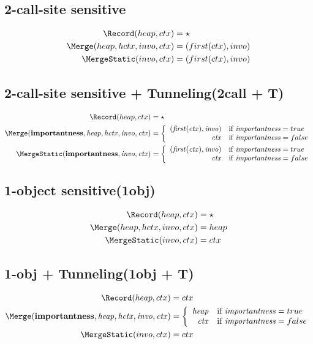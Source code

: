 \subsection{2-call-site sensitive}

\begin{align*}
	\Record (heap, ctx) &=\star\\
	\Merge (heap, hctx, invo, ctx)&= (first(ctx),invo)\\
	\MergeStatic (invo, ctx)&=(first(ctx),invo)\\
\end{align*}

\subsection{2-call-site sensitive + Tunneling(2call + T)}
\begin{align*}
\Record (heap, ctx) &= \star\\
\Merge ({\it \textbf{importantness}, heap, hctx, invo, ctx}) &= \left\{
 \begin{array}{rl}
{\it (first(ctx), invo)} & \mbox{if}~{\it importantness} = true \\
{\it ctx} & \mbox{if}~{\it importantness}=false
\end{array}
\right.\\
\MergeStatic ({\it \textbf{importantness}, invo, ctx}) &= \left\{
\begin{array}{rl}
{\it (first(ctx),invo)} & \mbox{if}~{\it importantness} = true \\
{\it ctx} & \mbox{if}~{\it importantness}=false
\end{array}
\right.\\
\end{align*}
\newpage
\subsection{1-object sensitive(1obj)}

\begin{align*}
	\Record (heap, ctx) &=\star\\
	\Merge (heap, hctx, invo, ctx)&= heap\\
	\MergeStatic (invo, ctx)&=ctx\\
\end{align*}

\subsection{1-obj + Tunneling(1obj + T)}
\begin{align*}
\Record (heap, ctx) &= ctx\\
\Merge ({\it \textbf{importantness}, heap, hctx, invo, ctx}) &= \left\{
 \begin{array}{rl}
{\it heap} & \mbox{if}~{\it importantness} = true \\
{\it ctx} & \mbox{if}~{\it importantness}=false
\end{array}
\right.\\
\MergeStatic (invo, ctx)&=ctx\\
\end{align*}

